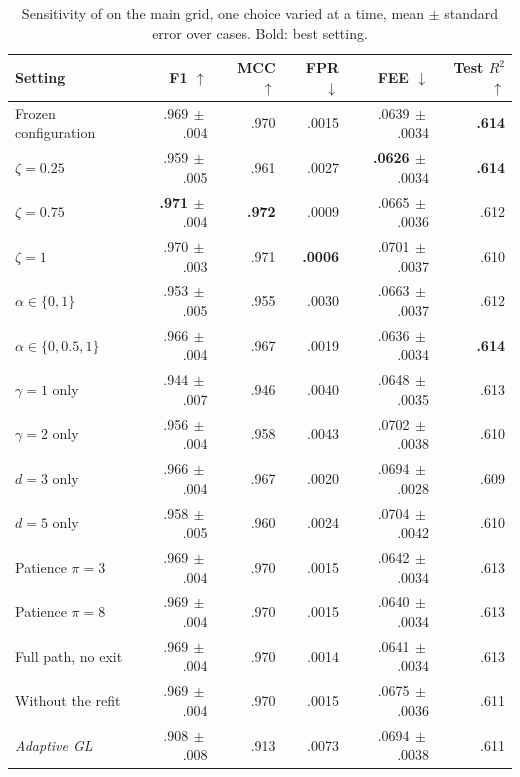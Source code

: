 \begin{table}[t]
\caption{Sensitivity of \sys{} on the main grid, one choice varied at a time, mean $\pm$ standard error over cases. Bold: best setting.}
\label{tab:sensitivity}
\centering
\scriptsize
\setlength{\tabcolsep}{1.5pt}
\begin{tabular*}{\columnwidth}{@{\extracolsep{\fill}}lrrrrr@{}}
\toprule
Setting & F1 $\uparrow$ & MCC $\uparrow$ & FPR $\downarrow$ & FEE $\downarrow$ & Test $R^2$ $\uparrow$\\
\midrule
Frozen configuration & .969{\tiny$\,\pm$.004} & .970 & .0015 & .0639{\tiny$\,\pm$.0034} & \textbf{.614}\\
$\zeta=0.25$ & .959{\tiny$\,\pm$.005} & .961 & .0027 & \textbf{.0626}{\tiny$\,\pm$.0034} & \textbf{.614}\\
$\zeta=0.75$ & \textbf{.971}{\tiny$\,\pm$.004} & \textbf{.972} & .0009 & .0665{\tiny$\,\pm$.0036} & .612\\
$\zeta=1$ & .970{\tiny$\,\pm$.003} & .971 & \textbf{.0006} & .0701{\tiny$\,\pm$.0037} & .610\\
$\alpha\in\{0,1\}$ & .953{\tiny$\,\pm$.005} & .955 & .0030 & .0663{\tiny$\,\pm$.0037} & .612\\
$\alpha\in\{0,0.5,1\}$ & .966{\tiny$\,\pm$.004} & .967 & .0019 & .0636{\tiny$\,\pm$.0034} & \textbf{.614}\\
$\gamma=1$ only & .944{\tiny$\,\pm$.007} & .946 & .0040 & .0648{\tiny$\,\pm$.0035} & .613\\
$\gamma=2$ only & .956{\tiny$\,\pm$.004} & .958 & .0043 & .0702{\tiny$\,\pm$.0038} & .610\\
$d=3$ only & .966{\tiny$\,\pm$.004} & .967 & .0020 & .0694{\tiny$\,\pm$.0028} & .609\\
$d=5$ only & .958{\tiny$\,\pm$.005} & .960 & .0024 & .0704{\tiny$\,\pm$.0042} & .610\\
Patience $\pi=3$ & .969{\tiny$\,\pm$.004} & .970 & .0015 & .0642{\tiny$\,\pm$.0034} & .613\\
Patience $\pi=8$ & .969{\tiny$\,\pm$.004} & .970 & .0015 & .0640{\tiny$\,\pm$.0034} & .613\\
Full path, no exit & .969{\tiny$\,\pm$.004} & .970 & .0014 & .0641{\tiny$\,\pm$.0034} & .613\\
Without the refit & .969{\tiny$\,\pm$.004} & .970 & .0015 & .0675{\tiny$\,\pm$.0036} & .611\\
\midrule
\textit{Adaptive GL} & .908{\tiny$\,\pm$.008} & .913 & .0073 & .0694{\tiny$\,\pm$.0038} & .611\\
\bottomrule
\end{tabular*}
\end{table}
